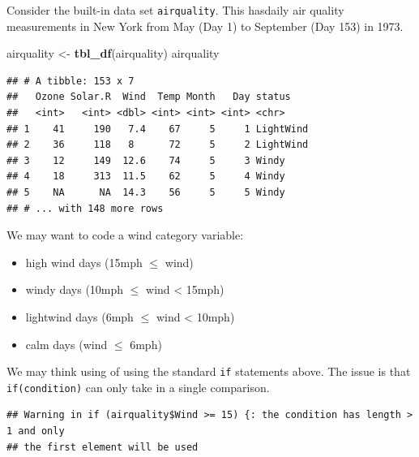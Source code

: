 \documentclass[
]{book}
\newenvironment{Shaded}{\begin{snugshade}}{\end{snugshade}}
\newcommand{\ControlFlowTok}[1]{\textcolor[rgb]{0.13,0.29,0.53}{\textbf{#1}}}
\newcommand{\DecValTok}[1]{\textcolor[rgb]{0.00,0.00,0.81}{#1}}
\newcommand{\KeywordTok}[1]{\textcolor[rgb]{0.13,0.29,0.53}{\textbf{#1}}}
\newcommand{\NormalTok}[1]{#1}
\newcommand{\OperatorTok}[1]{\textcolor[rgb]{0.81,0.36,0.00}{\textbf{#1}}}
\newcommand{\StringTok}[1]{\textcolor[rgb]{0.31,0.60,0.02}{#1}}
\providecommand{\tightlist}{%
  \setlength{\itemsep}{0pt}\setlength{\parskip}{0pt}}
\theoremstyle{definition}
\theoremstyle{definition}
\theoremstyle{definition}
\theoremstyle{remark}
\begin{document}
Consider the built-in data set \texttt{airquality}. This hasdaily air quality measurements in New York from May (Day 1) to September (Day 153) in 1973.

\begin{Shaded}
\begin{Highlighting}[]
\NormalTok{airquality <-}\StringTok{ }\KeywordTok{tbl_df}\NormalTok{(airquality)}
\NormalTok{airquality}
\end{Highlighting}
\end{Shaded}

\begin{verbatim}
## # A tibble: 153 x 7
##   Ozone Solar.R  Wind  Temp Month   Day status   
##   <int>   <int> <dbl> <int> <int> <int> <chr>    
## 1    41     190   7.4    67     5     1 LightWind
## 2    36     118   8      72     5     2 LightWind
## 3    12     149  12.6    74     5     3 Windy    
## 4    18     313  11.5    62     5     4 Windy    
## 5    NA      NA  14.3    56     5     5 Windy    
## # ... with 148 more rows
\end{verbatim}

We may want to code a wind category variable:

\begin{itemize}
\tightlist
\item
  high wind days (15mph \(\leq\) wind)\\
\item
  windy days (10mph \(\leq\) wind \textless{} 15mph)\\
\item
  lightwind days (6mph \(\leq\) wind \textless{} 10mph)\\
\item
  calm days (wind \(\leq\) 6mph)
\end{itemize}

We may think using of using the standard \texttt{if} statements above. The issue is that \texttt{if(condition)} can only take in a single comparison.

\begin{Shaded}
\end{Shaded}

\begin{verbatim}
## Warning in if (airquality$Wind >= 15) {: the condition has length > 1 and only
## the first element will be used
\end{verbatim}
\end{document}
